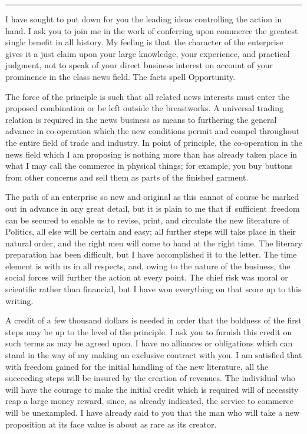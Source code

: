 \documentclass[openany,nobib]{tufte-book}
\begin{document}
\begin{center}
\vspace{0.2in}
\noindent\rule{2in}{0.5pt} 
\vspace{0.2in}
\end{center}


I have sought to put down for you the leading
ideas controlling the action in hand. I ask you to join me in the work
of conferring upon commerce the greatest single benefit in all history.
My feeling is that~the character of the enterprise gives it a just claim
upon your large knowledge, your experience, and practical judgment, not
to speak of your direct business interest on account of your prominence
in the class news field. The facts spell Opportunity.~

The force of the principle is such that all related news interests must
enter the proposed combination or be left outside the breastworks. A
universal trading relation is required in the news business as means to
furthering the general advance in co-operation which the new conditions
permit and compel throughout the entire field of trade and industry. In
point of principle, the co-operation in the news field which I am
proposing is nothing more than has already taken place in what I may
call the commerce in physical things; for example, you buy buttons from
other concerns and sell them as parts of the finished garment.~

The path of an enterprise so new and original as this cannot of course
be marked out in advance in any great detail, but it is plain to me that
if~sufficient~freedom can be secured to enable us to revise, print, and
circulate the new literature of Politics, all else will be certain and
easy; all further steps will take place in their natural order, and the
right men will come to hand at the right time. The literary preparation
has been difficult, but I have accomplished it to the letter. The time
element is with us in all respects, and, owing to the nature of the
business, the social forces will further the action at every point. The
chief risk was moral or scientific rather than financial, but I have won
everything on that score up to this writing.~

A credit of a few thousand dollars is needed in order that the boldness
of the first steps may be up to the level of the principle. I ask you to
furnish this credit on such terms as may be agreed upon. I have no
alliances or obligations which can stand in the way of my making an
exclusive contract with you. I am satisfied that with freedom gained for
the initial handling of the new literature, all the succeeding steps
will be insured by the creation of revenues. The individual who will
have the courage to make the initial credit which is required will of
necessity reap a large money reward, since, as already indicated, the
service to commerce will be unexampled. I have already said to you that
the man who will take a new proposition at its face value is about as
rare as its creator.~
\end{document}
